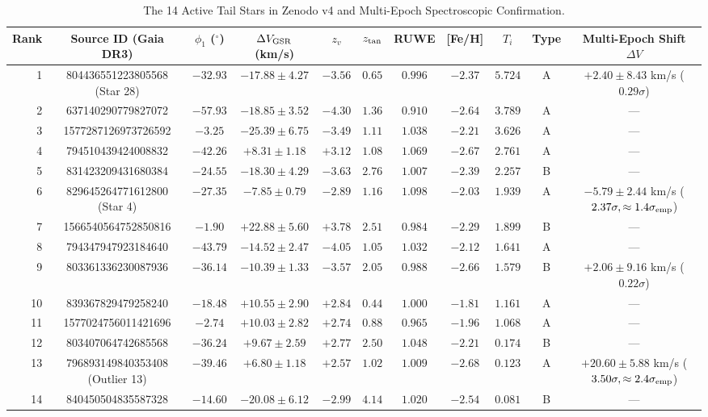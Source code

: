 \documentclass[twocolumn]{aastex631}
\begin{document}
\begin{table}[t]
\centering
\small
\caption{The 14 Active Tail Stars in Zenodo v4 and Multi-Epoch Spectroscopic Confirmation.}
\begin{tabular}{rcccccccccc}
\toprule
Rank & Source ID (Gaia DR3) & $\phi_1$ ($^\circ$) & $\Delta V_{\rm GSR}$ (km/s) & $z_v$ & $z_{\rm tan}$ & RUWE & [Fe/H] & $T_i$ & Type & Multi-Epoch Shift $\Delta V$ \\
\midrule
1 & 804436551223805568 (Star 28) & $-32.93$ & $-17.88 \pm 4.27$ & $-3.56$ & $0.65$ & $0.996$ & $-2.37$ & $5.724$ & A & $+2.40 \pm 8.43$ km/s ($0.29\sigma$) \\
2 & 637140290779827072 & $-57.93$ & $-18.85 \pm 3.52$ & $-4.30$ & $1.36$ & $0.910$ & $-2.64$ & $3.789$ & A & --- \\
3 & 1577287126973726592 & $-3.25$ & $-25.39 \pm 6.75$ & $-3.49$ & $1.11$ & $1.038$ & $-2.21$ & $3.626$ & A & --- \\
4 & 794510439424008832 & $-42.26$ & $+8.31 \pm 1.18$ & $+3.12$ & $1.08$ & $1.069$ & $-2.67$ & $2.761$ & A & --- \\
5 & 831423209431680384 & $-24.55$ & $-18.30 \pm 4.29$ & $-3.63$ & $2.76$ & $1.007$ & $-2.39$ & $2.257$ & B & --- \\
6 & 829645264771612800 (Star 4) & $-27.35$ & $-7.85 \pm 0.79$ & $-2.89$ & $1.16$ & $1.098$ & $-2.03$ & $1.939$ & A & $-5.79 \pm 2.44$ km/s ($2.37\sigma, \approx 1.4\sigma_{\rm emp}$) \\
7 & 1566540564752850816 & $-1.90$ & $+22.88 \pm 5.60$ & $+3.78$ & $2.51$ & $0.984$ & $-2.29$ & $1.899$ & B & --- \\
8 & 794347947923184640 & $-43.79$ & $-14.52 \pm 2.47$ & $-4.05$ & $1.05$ & $1.032$ & $-2.12$ & $1.641$ & A & --- \\
9 & 803361336230087936 & $-36.14$ & $-10.39 \pm 1.33$ & $-3.57$ & $2.05$ & $0.988$ & $-2.66$ & $1.579$ & B & $+2.06 \pm 9.16$ km/s ($0.22\sigma$) \\
10 & 839367829479258240 & $-18.48$ & $+10.55 \pm 2.90$ & $+2.84$ & $0.44$ & $1.000$ & $-1.81$ & $1.161$ & A & --- \\
11 & 1577024756011421696 & $-2.74$ & $+10.03 \pm 2.82$ & $+2.74$ & $0.88$ & $0.965$ & $-1.96$ & $1.068$ & A & --- \\
12 & 803407064742685568 & $-36.24$ & $+9.67 \pm 2.59$ & $+2.77$ & $2.50$ & $1.048$ & $-2.21$ & $0.174$ & B & --- \\
13 & 796893149840353408 (Outlier 13) & $-39.46$ & $+6.80 \pm 1.18$ & $+2.57$ & $1.02$ & $1.009$ & $-2.68$ & $0.123$ & A & $+20.60 \pm 5.88$ km/s ($3.50\sigma, \approx 2.4\sigma_{\rm emp}$) \\
14 & 840450504835587328 & $-14.60$ & $-20.08 \pm 6.12$ & $-2.99$ & $4.14$ & $1.020$ & $-2.54$ & $0.081$ & B & --- \\
\bottomrule
\end{tabular}
\label{tab:stars}
\end{table}
\end{document}

